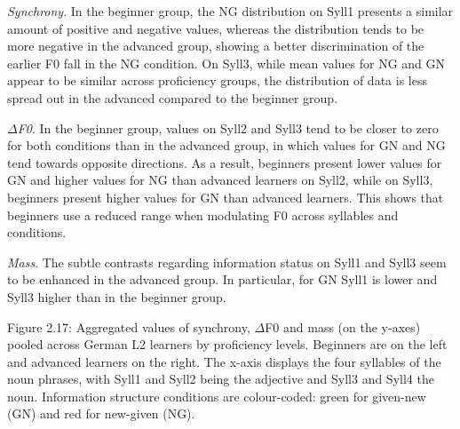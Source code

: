 \begin{listWWNumiiileveli}
\item 
\begin{stylelsBulletList}
\textit{Synchrony}. In the beginner group, the NG distribution on Syll1 presents a similar amount of positive and negative values, whereas the distribution tends to be more negative in the advanced group, showing a better discrimination of the earlier F0 fall in the NG condition. On Syll3, while mean values for NG and GN appear to be similar across proficiency groups, the distribution of data is less spread out in the advanced compared to the beginner group.
\end{stylelsBulletList}
\item 
\begin{stylelsBulletList}
\textit{${\Delta}$F0}. In the beginner group, values on Syll2 and Syll3 tend to be closer to zero for both conditions than in the advanced group, in which values for GN and NG tend towards opposite directions. As a result, beginners present lower values for GN and higher values for NG than advanced learners on Syll2, while on Syll3, beginners present higher values for GN than advanced learners. This shows that beginners use a reduced range when modulating F0 across syllables and conditions.
\end{stylelsBulletList}
\item 
\begin{stylelsBulletList}
\textit{Mass}. The subtle contrasts regarding information status on Syll1 and Syll3 seem to be enhanced in the advanced group. In particular, for GN Syll1 is lower and Syll3 higher than in the beginner group.
\end{stylelsBulletList}
\end{listWWNumiiileveli}
\begin{styleStandard}
  [Warning: Image ignored] %
 
\end{styleStandard}

\begin{stylecaption}
Figure 2.17: Aggregated values of synchrony, ${\Delta}$F0 and mass (on the y-axes) pooled across German L2 learners by proficiency levels. Beginners are on the left and advanced learners on the right. The x-axis displays the four syllables of the noun phrases, with Syll1 and Syll2 being the adjective and Syll3 and Syll4 the noun. Information structure conditions are colour-coded: green for given-new (GN) and red for new-given (NG).
\end{stylecaption}

